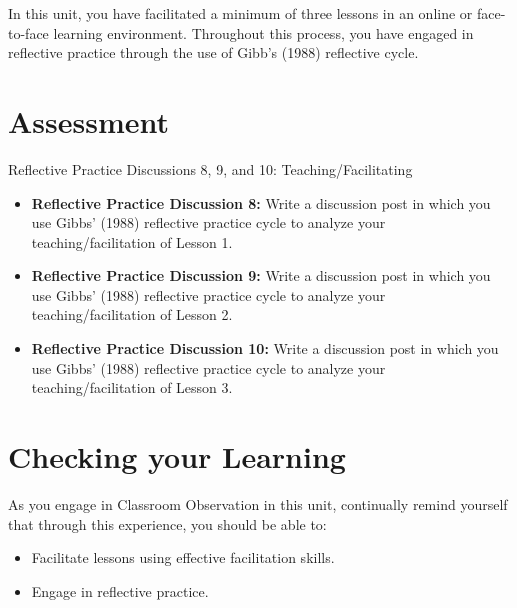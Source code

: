 \documentclass[
]{book}
\providecommand{\tightlist}{%
  \setlength{\itemsep}{0pt}\setlength{\parskip}{0pt}}
\begin{document}
In this unit, you have facilitated a minimum of three lessons in an online or face-to-face learning environment. Throughout this process, you have engaged in reflective practice through the use of Gibb's (1988) reflective cycle.

\hypertarget{assessment-3}{%
\section*{Assessment}\label{assessment-3}}

\begin{assessment}
{Reflective Practice Discussions 8, 9, and 10: Teaching/Facilitating}

\begin{itemize}
\tightlist
\item
  \textbf{Reflective Practice Discussion 8:} Write a discussion post in which you use Gibbs' (1988) reflective practice cycle to analyze your teaching/facilitation of Lesson 1.\\
\item
  \textbf{Reflective Practice Discussion 9:} Write a discussion post in which you use Gibbs' (1988) reflective practice cycle to analyze your teaching/facilitation of Lesson 2.\\
\item
  \textbf{Reflective Practice Discussion 10:} Write a discussion post in which you use Gibbs' (1988) reflective practice cycle to analyze your teaching/facilitation of Lesson 3.
\end{itemize}
\end{assessment}

\hypertarget{checking-your-learning-4}{%
\section*{Checking your Learning}\label{checking-your-learning-4}}

\begin{progress}
As you engage in Classroom Observation in this unit, continually remind yourself that through this experience, you should be able to:

\begin{itemize}
\tightlist
\item
  Facilitate lessons using effective facilitation skills.\\
\item
  Engage in reflective practice.
\end{itemize}
\end{progress}
\end{document}
